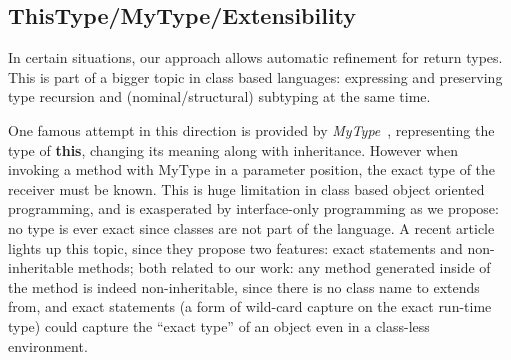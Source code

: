

\subsection{ThisType/MyType/Extensibility}

In certain situations, our approach allows automatic refinement for return types. This is part of a bigger topic in class based languages: expressing and preserving type recursion and (nominal/structural) subtyping at the same time. 

One famous attempt in this direction is provided by 
\emph{MyType}~\cite{bruce1994paradigmatic}, representing the type of \textbf{this}, changing its meaning along with
inheritance.
However when invoking a method with MyType in a parameter position, the exact type of the receiver must be known.
This is huge limitation in class based object oriented programming,
and is exasperated by interface-only programming as we propose: no type is ever exact since classes are not part of the language.
A recent article~\cite{igarashi Matching MyType to subtyping}
lights up this topic, since
they propose two features: exact statements and non-inheritable methods; both related to our work:
any method generated inside of the \Q@of@ method is indeed non-inheritable, since there is no class name to extends from, and exact statements (a form of wild-card capture on the exact run-time type)
could capture the ``exact type'' of an object even in a class-less environment.





